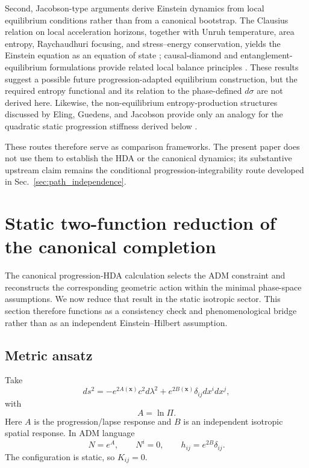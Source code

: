 \documentclass[11pt]{article}
\begin{document}
Second, Jacobson-type arguments derive Einstein dynamics from local equilibrium conditions rather than from a canonical bootstrap. The Clausius relation on local acceleration horizons, together with Unruh temperature, area entropy, Raychaudhuri focusing, and stress--energy conservation, yields the Einstein equation as an equation of state \cite{Jacobson1995}; causal-diamond and entanglement-equilibrium formulations provide related local balance principles \cite{Jacobson2016,JacobsonVisser2019}. These results suggest a possible future progression-adapted equilibrium construction, but the required entropy functional and its relation to the phase-defined $d\sigma$ are not derived here. Likewise, the non-equilibrium entropy-production structures discussed by Eling, Guedens, and Jacobson provide only an analogy for the quadratic static progression stiffness derived below \cite{Eling2006}.

These routes therefore serve as comparison frameworks. The present paper does not use them to establish the HDA or the canonical dynamics; its substantive upstream claim remains the conditional progression-integrability route developed in Sec.~\ref{sec:path_independence}.

\section{Static two-function reduction of the canonical completion}

The canonical progression-HDA calculation selects the ADM constraint and reconstructs the corresponding geometric action within the minimal phase-space assumptions. We now reduce that result in the static isotropic sector. This section therefore functions as a consistency check and phenomenological bridge rather than as an independent Einstein--Hilbert assumption.

\subsection{Metric ansatz}

Take
\begin{equation}
    \boxed{
    ds^2=-e^{2A(\mathbf x)}c^2d\lambda^2
    +e^{2B(\mathbf x)}\delta_{ij}dx^idx^j,}
    \label{eq:AB_metric}
\end{equation}
with
\begin{equation}
    A=\ln\Pi.
\end{equation}
Here $A$ is the progression/lapse response and $B$ is an independent isotropic spatial response. In ADM language
\begin{equation}
    N=e^A,\qquad N^i=0,\qquad h_{ij}=e^{2B}\delta_{ij}.
\end{equation}
The configuration is static, so $K_{ij}=0$.
\end{document}
